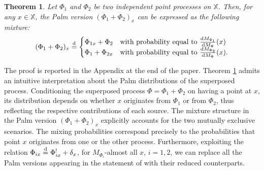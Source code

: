 \documentclass[11pt,a4paper,oneside]{article}
\newcommand{\deq}{\stackrel{\mbox{\scriptsize d}}{=}}
\newcommand{\dd}{\mathrm d}
\newcommand{\X}{\mathbb{X}}
\newtheorem{theorem}{Theorem}
\theoremstyle{definition}
\theoremstyle{remark}
\begin{document}
\begin{theorem}\label{teo:main}
    Let $\Phi_1$ and $\Phi_2$ be two independent point processes on $\X$. Then, for any $x \in \X$, the Palm version $(\Phi_1 + \Phi_2)_{x}$ can be expressed as the following mixture:
    \[
        (\Phi_1 + \Phi_2)_{x} \deq \begin{cases}
            \Phi_{1 x} + \Phi_2 & \text{with probability equal to }  \frac{\dd M_{\Phi_1}}{\dd M_\Phi}(x) \\
            \Phi_{1} + \Phi_{2 x} & \text{with probability equal to } \frac{\dd M_{\Phi_2}}{\dd M_\Phi}(x).
        \end{cases}
    \]
\end{theorem}
The proof is reported in the Appendix at the end of the paper. Theorem \ref{teo:main} admits an intuitive interpretation about the Palm distributions of the superposed process. Conditioning the superposed process $\Phi= \Phi_1+\Phi_2$ on having a point at $x$, its distribution depends on whether $x$ originates from $\Phi_1$ or from $\Phi_2$, thus reflecting the respective contributions of each source.
The mixture structure in the Palm version $(\Phi_1 + \Phi_2)_{x}$  explicitly accounts for the two mutually exclusive scenarios. 
The mixing probabilities correspond precisely to the probabilities that point $x$ originates from one or the other process.
Furthermore, exploiting the relation $\Phi_{i x} \deq \Phi_{i x}^! + \delta_x$, for $M_{\Phi_i}$-almost all $x$, $i=1, 2$, we can replace all the Palm versions appearing in the statement of  with their reduced counterparts.
\end{document}
